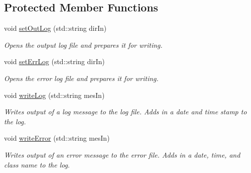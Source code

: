 \subsection*{Protected Member Functions}
\begin{DoxyCompactItemize}
\item 
void \hyperlink{classosea_1_1ofreq_1_1o_freq_core_ab47d54b0a8efd12d5124334f823800b9}{set\-Out\-Log} (std\-::string dir\-In)
\begin{DoxyCompactList}\small\item\em Opens the output log file and prepares it for writing. \end{DoxyCompactList}\item 
void \hyperlink{classosea_1_1ofreq_1_1o_freq_core_a12d276a8989bf96fdba79654a516bb14}{set\-Err\-Log} (std\-::string dir\-In)
\begin{DoxyCompactList}\small\item\em Opens the error log file and prepares it for writing. \end{DoxyCompactList}\item 
void \hyperlink{classosea_1_1ofreq_1_1o_freq_core_a1b85faf81110e491b5245f2cbc2ac23b}{write\-Log} (std\-::string mes\-In)
\begin{DoxyCompactList}\small\item\em Writes output of a log message to the log file. Adds in a date and time stamp to the log. \end{DoxyCompactList}\item 
void \hyperlink{classosea_1_1ofreq_1_1o_freq_core_a4671f6ce9f5eb62b1a587a1118934dee}{write\-Error} (std\-::string mes\-In)
\begin{DoxyCompactList}\small\item\em Writes output of an error message to the error file. Adds in a date, time, and class name to the log. \end{DoxyCompactList}\end{DoxyCompactItemize}
